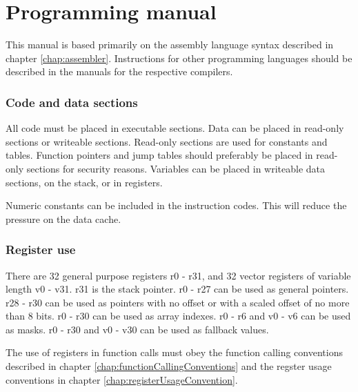 \documentclass[forwardcom.tex]{subfiles}
\begin{document}
\RaggedRight
\lstset{language=C}            %
\lstset{basicstyle=\ttfamily,breaklines=true}

\chapter{Programming manual}\label{chap:programmingManual}
This manual is based primarily on the assembly language syntax described in chapter \ref{chap:assembler}.
Instructions for other programming languages should be described in the manuals for the respective compilers.
\vspace{2mm}

\subsection{Code and data sections} \label{codeDataSections}
All code must be placed in executable sections. Data can be placed in read-only sections or
writeable sections. Read-only sections are used for constants and tables. Function pointers
and jump tables should preferably be placed in read-only sections for security reasons.
Variables can be placed in writeable data sections, on the stack, or in registers.
\vspace{2mm}

Numeric constants can be included in the instruction codes. This will reduce the pressure on the data cache.
\vspace{2mm}

\subsection{Register use} \label{registerUse}
There are 32 general purpose registers r0 - r31, and 32 vector registers of variable length v0 - v31.
r31 is the stack pointer. r0 - r27 can be used as general pointers. r28 - r30 can be used as pointers
with no offset or with a scaled offset of no more than 8 bits. r0 - r30 can be used as array indexes.
r0 - r6 and v0 - v6 can be used as masks. r0 - r30 and v0 - v30 can be used as fallback values.

\vspace{2mm}
The use of registers in function calls must obey the function calling conventions described in chapter \ref{chap:functionCallingConventions} and the regster usage conventions in chapter
\ref{chap:registerUsageConvention}.
\vspace{2mm}
\end{document}
